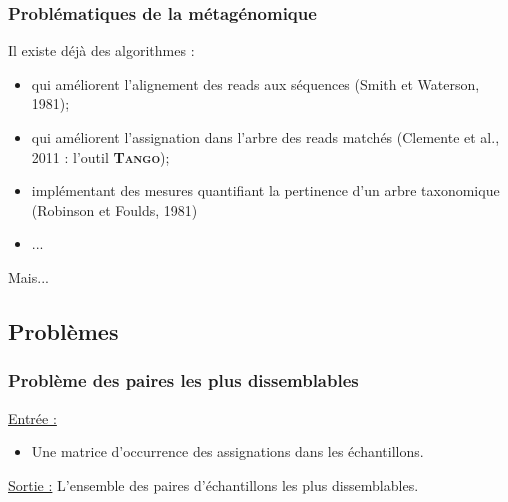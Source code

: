 \documentclass{beamer}
\begin{document}
\begin{frame}
\frametitle{Problématiques de la métagénomique}

Il existe déjà des algorithmes :
\begin{itemize}
\item qui améliorent l'alignement des reads aux séquences (Smith et Waterson, 1981);
\item qui améliorent l'assignation dans l'arbre des reads matchés (Clemente et al., 2011 : l'outil\textsc{ \bf Tango});
\item implémentant des mesures quantifiant la pertinence d'un arbre taxonomique (Robinson et Foulds, 1981)
\item ...
\end{itemize}

\begin{center}
Mais...
\end{center}



\end{frame}

\subsection{Problèmes}


\begin{frame}
\frametitle{Problème des paires les plus dissemblables}

\uline{Entrée :} \begin{itemize} \item Une matrice d'occurrence des assignations dans les échantillons. \end{itemize}

\bigskip
\uline{Sortie :} L'ensemble des paires d'échantillons les plus dissemblables.

\end{frame}
\end{document}
